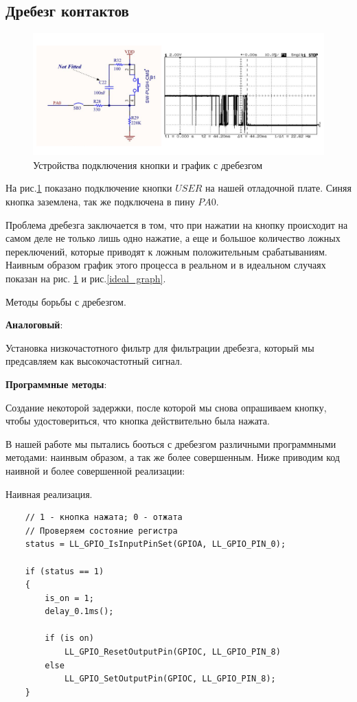 \subsection{Дребезг контактов}


\begin{figure}[h!]
		\centering
		\includegraphics[width=1\linewidth]{pics/drebezg.png}
		\caption{Устройства подключения кнопки и график с дребезгом}
		\label{drebezg}
\end{figure}

На рис.\ref{drebezg} показано подключение кнопки $USER$ на нашей отладочной плате.
Синяя кнопка заземлена, так же подключена в пину $PA0$. 
	
	
Проблема дребезга заключается в том, что при нажатии на кнопку происходит на самом деле не только лишь одно нажатие, а еще и большое количество ложных переключений, которые приводят к ложным положительным срабатываниям. Наивным образом график этого процесса в реальном и в идеальном случаях показан на рис. \ref{drebezg} и рис.\ref{ideal_graph}.

Методы борьбы с дребезгом.

\textbf{Аналоговый}:

Установка низкочастотного фильтр для фильтрации дребезга, который мы предсавляем как высокочастотный сигнал.

\textbf{Программные методы}:

Создание некоторой задержки, после которой мы снова опрашиваем кнопку, чтобы удостовериться, что кнопка действительно была нажата.


В нашей работе мы пытались бооться с дребезгом различными программными методами: наинвым образом, а так же более совершенным. Ниже приводим код наивной и более совершенной реализации:


    Наивная реализация.
\begin{verbatim}
    // 1 - кнопка нажата; 0 - отжата
    // Проверяем состояние регистра
    status = LL_GPIO_IsInputPinSet(GPIOA, LL_GPIO_PIN_0); 
    
    if (status == 1) 
    {   
        is_on = 1;
        delay_0.1ms();
        
        if (is on)
            LL_GPIO_ResetOutputPin(GPIOC, LL_GPIO_PIN_8) 
        else 
            LL_GPIO_SetOutputPin(GPIOC, LL_GPIO_PIN_8);
    }
\end{verbatim}
    
